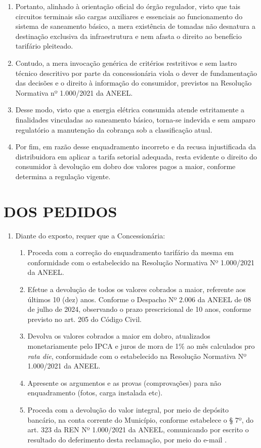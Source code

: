 \begin{enumerate}[resume]
    \item Portanto, alinhado à orientação oficial do órgão regulador, visto que tais circuitos terminais são cargas auxiliares e essenciais ao funcionamento do sistema de saneamento básico, a mera existência de tomadas não desnatura a destinação exclusiva da infraestrutura e nem afasta o direito ao benefício tarifário pleiteado.  

    \item Contudo, a mera invocação genérica de critérios restritivos e sem lastro técnico descritivo por parte da concessionária viola o dever de fundamentação das decisões e o direito à informação do consumidor, previstos na Resolução Normativa nº 1.000/2021 da ANEEL.  

    \item Desse modo, visto que a energia elétrica consumida atende estritamente a finalidades vinculadas ao saneamento básico, torna-se indevida e sem amparo regulatório a manutenção da cobrança sob a classificação atual.  

    \item Por fim, em razão desse enquadramento incorreto e da recusa injustificada da distribuidora em aplicar a tarifa setorial adequada, resta evidente o direito do consumidor à devolução em dobro dos valores pagos a maior, conforme determina a regulação vigente.
\end{enumerate}

\section{DOS PEDIDOS}

\begin{enumerate}[resume]
\item 
Diante do exposto, requer que a Concessionária:

\begin{enumerate}
\item 
Proceda com a correção do enquadramento tarifário da mesma em conformidade com o estabelecido na Resolução Normativa Nº 1.000/2021 da ANEEL.
\item 
Efetue a devolução de todos os valores cobrados a maior, referente aos últimos 10 (dez) anos. Conforme o Despacho Nº 2.006 da ANEEL de 08 de julho de 2024, observando o prazo prescricional de 10 anos, conforme previsto no art. 205 do Código Civil.
\item 
Devolva os valores cobrados a maior em dobro, atualizados monetariamente pelo IPCA e juros de mora de 1\% ao mês calculados pro \textit{rata die}, conformidade com o estabelecido na Resolução Normativa Nº 1.000/2021 da ANEEL.   
\item 
Apresente os argumentos e as provas (comprovações) para não enquadramento (fotos, carga instalada etc).   
\item 
Proceda com a devolução do valor integral, por meio de depósito bancário, na conta corrente do Município, conforme estabelece o § 7º, do art. 323 da REN Nº 1.000/2021 da ANEEL, comunicando por escrito o resultado do deferimento desta reclamação, por meio do e-mail \EmailEmpresa{}.

\end{enumerate}
\end{enumerate}